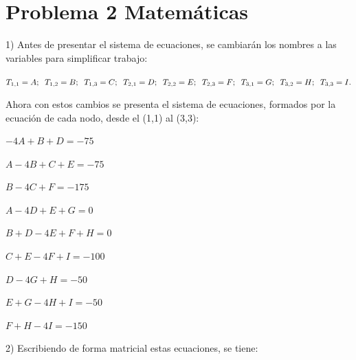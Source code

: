 \documentclass[10pt,twoside]{article}
\begin{document}
\clearpage
\section{Problema 2 Matemáticas}
\centering

\begin{flushleft}
1) Antes de presentar el sistema de ecuaciones, se cambiarán los nombres a las variables para simplificar trabajo:
\begin{center}
$T_{1,1} = A; \hspace{2mm} T_{1,2} = B; \hspace{2mm} T_{1,3} = C;\hspace{2mm}T_{2,1} = D;\hspace{2mm}T_{2,2} = E;\hspace{2mm}T_{2,3} = F;\hspace{2mm}T_{3,1} = G;\hspace{2mm}T_{3,2} = H;\hspace{2mm}T_{3,3} = I.$
\end{center}
Ahora con estos cambios se presenta el sistema de ecuaciones, formados por la ecuación de cada nodo, desde el (1,1) al (3,3):

\begin{center}
$-4A + B + D = -75$

$A - 4B + C + E = -75$

$B - 4C + F = -175$

$A - 4D + E + G = 0$

$B + D - 4E + F + H = 0$

$C + E - 4F + I = -100$

$D - 4G + H = -50$

$E + G - 4H + I = -50$

$F + H - 4I = -150$

\end{center}

2) Escribiendo de forma matricial estas ecuaciones, se tiene:

\end{flushleft}
\end{document}
